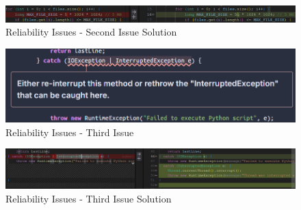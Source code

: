 \documentclass[12pt,a4paper]{article}
\begin{document}
\begin{figure}[H]
    \centering
    \includegraphics[width=1\textwidth]{Reliability Issues-2ndS.png}
    \caption{Reliability Issues - Second Issue Solution}
    \label{fig:2ndS}
\end{figure}
\begin{figure}[H]
    \centering
    \includegraphics[width=1\textwidth]{Reliability Issues-3rd.png}
    \caption{Reliability Issues - Third Issue}
    \label{fig:3rd}
\end{figure}
\begin{figure}[H]
    \centering
    \includegraphics[width=1\textwidth]{Reliability Issues-3rdS.png}
    \caption{Reliability Issues - Third Issue Solution}
    \label{fig:3rdS}
\end{figure}
\end{document}
